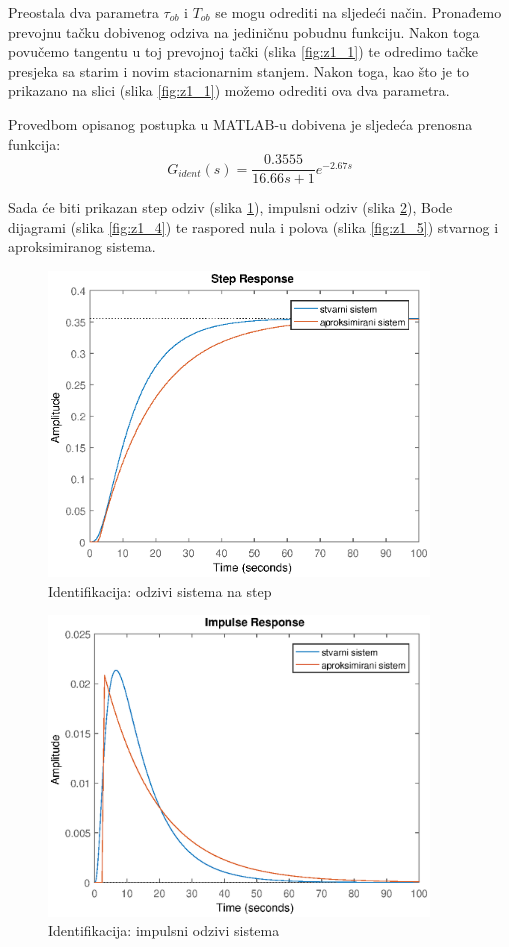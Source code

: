 Preostala dva parametra $\tau_{ob}$ i $T_{ob}$ se mogu odrediti na sljedeći način. Pronađemo prevojnu tačku dobivenog odziva na jediničnu pobudnu funkciju. Nakon toga povučemo tangentu u toj prevojnoj tački (slika \ref{fig:z1_1}) te odredimo tačke presjeka sa starim i novim stacionarnim stanjem. Nakon toga, kao što je to prikazano na slici (slika \ref{fig:z1_1}) možemo odrediti ova dva parametra.

Provedbom opisanog postupka u MATLAB-u dobivena je sljedeća prenosna funkcija:
	\[G_{ident} (s)=\frac{0.3555}{16.66s+1} e^{-2.67s} \]

Sada će biti prikazan step odziv (slika \ref{fig:z1_2}), impulsni odziv (slika \ref{fig:z1_3}), Bode dijagrami (slika \ref{fig:z1_4}) te raspored nula i polova (slika \ref{fig:z1_5}) stvarnog i aproksimiranog sistema.

\begin{figure} [H]
  \centering
  \includegraphics[width=0.9\textwidth]{z1_2}
  \caption{Identifikacija: odzivi sistema na step}
  \label{fig:z1_2}
\end{figure}

\begin{figure} [H]
  \centering
  \includegraphics[width=0.9\textwidth]{z1_3}
  \caption{Identifikacija: impulsni odzivi sistema}
  \label{fig:z1_3}
\end{figure}

